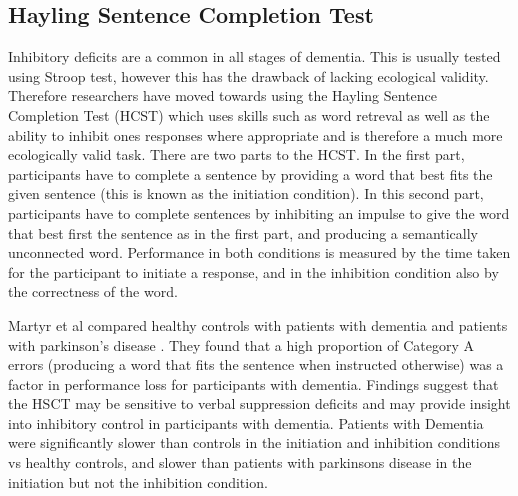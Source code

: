 \documentclass[10pt, letterpaper, twoside, openany]{book}
\begin{document}
\subsection{Hayling Sentence Completion Test}
Inhibitory deficits are a common in all stages of dementia. This is usually tested using Stroop test, however this has the drawback of lacking ecological validity. Therefore researchers have moved towards using the Hayling Sentence Completion Test (HCST) which uses skills such as word retreval as well as the ability to inhibit ones responses where appropriate and is therefore a much more ecologically valid task. There are two parts to the HCST. In the first part, participants have to complete a sentence by providing a word that best fits the given sentence (this is known as the initiation condition). In this second part, participants have to complete sentences by inhibiting an impulse to give the word that best first the sentence as in the first part, and producing a semantically unconnected word. Performance in both conditions is measured by the time taken for the participant to initiate a response, and in the inhibition condition also by the correctness of the word.   
\par 
Martyr et al compared healthy controls with patients with dementia and patients with parkinson's disease \cite{Martyr2017}. They found that a high proportion of Category A errors (producing a word that fits the sentence when instructed otherwise) was a factor in performance loss for participants with dementia. Findings suggest that the HSCT may be sensitive to verbal suppression deficits and may provide insight into inhibitory control in participants with dementia. Patients with Dementia were significantly slower than controls in the initiation and inhibition conditions vs healthy controls, and slower than patients with parkinsons disease in the initiation but not the inhibition condition.
\end{document}
